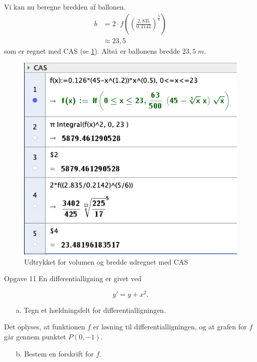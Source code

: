 \documentclass{article}
\begin{document}
Vi kan nu beregne bredden af ballonen.
\begin{equation*}
\begin{split}
  b&=2 \cdot f\left(\left(\frac{2,835}{0,2142}\right) ^{\frac{5}{6}}\right) \\
  &\approx 23,5
\end{split}
\end{equation*}
som er regnet med CAS (se \cref{fig:ballon}).
Altså er ballonens bredde $23,5 \;\unit{m} $.
\begin{figure}[H]
\begin{center}
  \includegraphics[scale=0.5]{ballon.png}
\end{center}
\caption{Udtrykket for volumen og bredde udregnet med CAS}
\label{fig:ballon}
\end{figure}
\begin{question}{Opgave 11}{}
 En differentialligning er givet ved

$$y'=y+x^2.$$
\begin{itemize}
  \item[a.] Tegn et hældningsfelt for differentialligningen.
\end{itemize}
Det oplyses, at funktionen $f$ er løsning til differentialligningen, og at grafen for $f$ går gennem punktet $P(0,-1).$
\begin{itemize}
  \item[b.] Bestem en forskrift for $f.$ 
\end{itemize}
\end{question}
\end{document}
